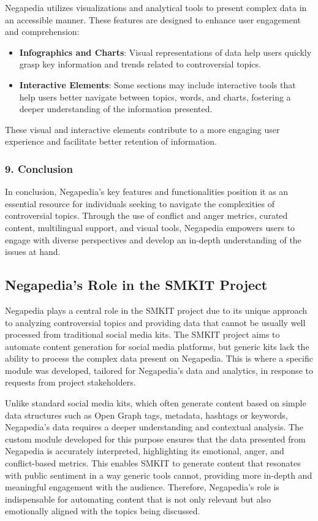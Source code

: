 Negapedia utilizes visualizations and analytical tools to present complex data in an accessible manner. These features are designed to enhance user engagement and comprehension:

\begin{itemize}
    \item \textbf{Infographics and Charts}: Visual representations of data help users quickly grasp key information and trends related to controversial topics.
    \item \textbf{Interactive Elements}: Some sections may include interactive tools that help users better navigate between topics, words, and charts, fostering a deeper understanding of the information presented.
\end{itemize}

These visual and interactive elements contribute to a more engaging user experience and facilitate better retention of information.

\subsubsection{9. Conclusion}

In conclusion, Negapedia’s key features and functionalities position it as an essential resource for individuals seeking to navigate the complexities of controversial topics. Through the use of conflict and anger metrics, curated content, multilingual support, and visual tools, Negapedia empowers users to engage with diverse perspectives and develop an in-depth understanding of the issues at hand.


\subsection{Negapedia's Role in the SMKIT Project}
\label{subsec:negapedia_s_role_in_the_smkit_project}

Negapedia plays a central role in the SMKIT project due to its unique approach to analyzing controversial topics and providing data that cannot be usually well processed from traditional social media kits. The SMKIT project aims to automate content generation for social media platforms, but generic kits lack the ability to process the complex data present on Negapedia. This is where a specific module was developed, tailored for Negapedia’s data and analytics, in response to requests from project stakeholders.

Unlike standard social media kits, which often generate content based on simple data structures such as Open Graph tags, metadata, hashtags or keywords, Negapedia’s data requires a deeper understanding and contextual analysis. The custom module developed for this purpose ensures that the data presented from Negapedia is accurately interpreted, highlighting its emotional, anger, and conflict-based metrics. This enables SMKIT to generate content that resonates with public sentiment in a way generic tools cannot, providing more in-depth and meaningful engagement with the audience. Therefore, Negapedia’s role is indispensable for automating content that is not only relevant but also emotionally aligned with the topics being discussed.

